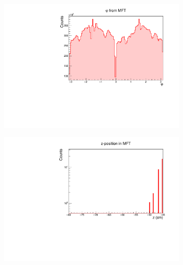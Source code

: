 \documentclass[10pt]{beamer}
\begin{document}
\begin{frame}
\begin{columns}
\begin{column}{0.5\textwidth}
\begin{figure}
\begin{center}
                \end{center}
            \end{figure}
        \end{column}
        \begin{column}{0.5\textwidth}
            \vspace*{-0.43cm}
            \begin{figure}
                \begin{center}
                    \includegraphics[width=0.95\textwidth]{Plots/pass4_MFT/phi_pass4.pdf}
                \end{center}
            \end{figure}
            \vspace*{-0.6cm}
            \begin{figure}
                \begin{center}
                    \includegraphics[width=0.95\textwidth]{Plots/pass4_MFT/Z_MFT_pass4.pdf}
                \end{center}
            \end{figure}
        \end{column}
    \end{columns}

\end{frame}
\end{document}
